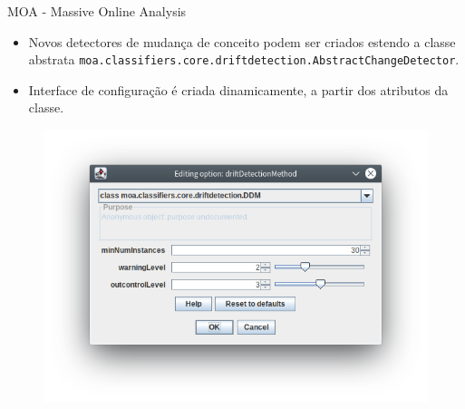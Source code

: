 \documentclass[10pt]{beamer}
\begin{document}
\begin{frame}{MOA - Massive Online Analysis}
    \begin{itemize}
        \item Novos detectores de mudança de conceito podem ser criados estendo a classe abstrata \texttt{moa.classifiers.core.driftdetection.AbstractChangeDetector}.
        \item Interface de configuração é criada dinamicamente, a partir dos atributos da classe.
    \end{itemize}

    \begin{figure}[H]
        \begin{center}
            \includegraphics[scale=0.5]{imagens/detector.png}
        \end{center}
    \end{figure}
\end{frame}
\end{document}
